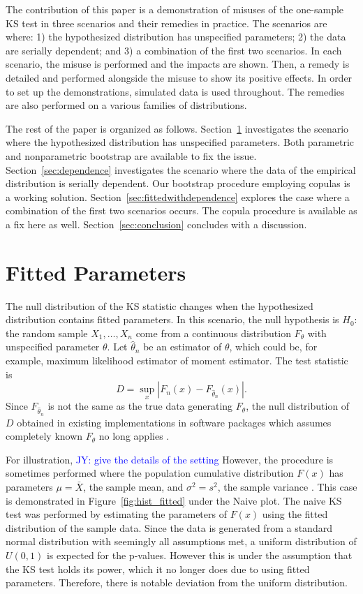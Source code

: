 \documentclass[12pt, letterpaper, titlepage]{article}
\newcommand{\jy}[1]{\textcolor{blue}{JY: #1}}
\begin{document}
The contribution of this paper is a demonstration of misuses of the one-sample
KS test in three scenarios and their remedies in practice. The scenarios are 
where:
1) the hypothesized distribution has unspecified parameters;
2) the data are serially dependent; and
3) a combination of the first two scenarios. 
In each scenario, the misuse is performed and the impacts are shown. Then, a
remedy is detailed and performed alongside the misuse to show its positive 
effects. In order to set up the demonstrations, simulated data is used 
throughout. The remedies are also performed on a various families of 
distributions.

The rest of the paper is organized as follows. Section~\ref{sec:fitted}
investigates the scenario where the hypothesized distribution has unspecified
parameters. Both parametric and nonparametric bootstrap are available to fix the
issue. Section~\ref{sec:dependence} investigates the scenario where the data of 
the empirical distribution is serially dependent. Our bootstrap procedure 
employing copulas is a working solution. Section~\ref{sec:fittedwithdependence}
explores the case where a combination of the first two scenarios occurs. The 
copula procedure is available as a fix here as well. 
Section~\ref{sec:conclusion} concludes with a discussion.

\section{Fitted Parameters}\label{sec:fitted}

The null distribution of the KS statistic changes when the hypothesized
distribution contains fitted parameters. In this scenario, the null hypothesis
is $H_0$: the random sample $X_1, \ldots, X_n$ come from a continuous
distribution $F_{\theta}$ with unspecified parameter $\theta$.
Let $\hat\theta_n$ be an estimator of $\theta$, which could be, for example,
maximum likelihood estimator of moment estimator. The test statistic is
\begin{equation}
  \label{eq:ks_fitted}
  D = \sup_x | F_n(x) - F_{\hat\theta_n}(x) |.
\end{equation}
Since $F_{\hat\theta_n}$ is not the same as the true data generating
$F_\theta$, the null distribution of $D$ obtained in existing implementations in
software packages which assumes completely known $F_\theta$ no long applies
\citep{Steinskog}.


For illustration, \jy{give the details of the setting}
However, the procedure is sometimes performed where the population cumulative 
distribution $F(x)$ has parameters $\mu=\bar X$, the sample mean, and $\sigma^2=s^2$, 
the sample variance \citep{Lilliefors}. This case is demonstrated in Figure~\ref{fig:hist_fitted} 
under the Naive plot. The naive KS test was performed by estimating the parameters 
of $F(x)$ using the fitted distribution of the sample data. Since the data is generated 
from a standard normal distribution with seemingly all assumptions met, a uniform 
distribution of $U(0,1)$ is expected for the p-values. However this is under the 
assumption that the KS test holds its power, which it no longer does due to using 
fitted parameters. Therefore, there is notable deviation from the uniform distribution. 
\end{document}
